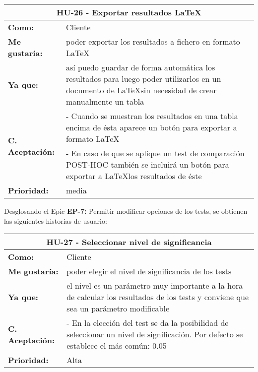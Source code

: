 
\begin{table}[H]
	\begin{tabular}{| p{3cm}| p{11cm} |}
		\hline
		\multicolumn{2}{|c|}{\textbf{HU-26} - Exportar resultados \LaTeX} \\ \hline
		\textbf{Como:} & Cliente \\ \hline
		\textbf{Me gustaría:} & poder exportar los resultados a fichero en formato \LaTeX \\ \hline
		\textbf{Ya que:} & así puedo guardar de forma automática los resultados para luego poder utilizarlos en un documento de \LaTeX sin necesidad de crear manualmente un tabla \\ \hline
		\multirow{2}{11cm}{\textbf{C. Aceptación:}} & - Cuando se muestran los resultados en una tabla encima de ésta aparece un botón para exportar a formato \LaTeX \\
		& - En caso de que se aplique un test de comparación POST-HOC también se incluirá un botón para exportar a \LaTeX los resultados de éste \\ \hline
		\textbf{\textbf{Prioridad:}} & media \\ \hline
	\end{tabular}
\end{table}


Desglosando el Epic \textbf{EP-7:} Permitir modificar opciones de los tests, se obtienen las siguientes historias de usuario:

\begin{table}[H]
	\begin{tabular}{| p{3cm}| p{11cm} |}
		\hline
		\multicolumn{2}{|c|}{\textbf{HU-27} - Seleccionar nivel de significancia} \\ \hline
		\textbf{Como:} & Cliente \\ \hline
		\textbf{Me gustaría:} & poder elegir el nivel de significancia de los tests \\ \hline
		\textbf{Ya que:} & el nivel es un parámetro muy importante a la hora de calcular los resultados de los tests y conviene que sea un parámetro modificable \\ \hline
		\textbf{C. Aceptación:} & - En la elección del test se da la posibilidad de seleccionar un nivel de significación. Por defecto se establece el más común: 0.05  \\ \hline
		\textbf{\textbf{Prioridad:}} & Alta \\ \hline
	\end{tabular}
\end{table}

